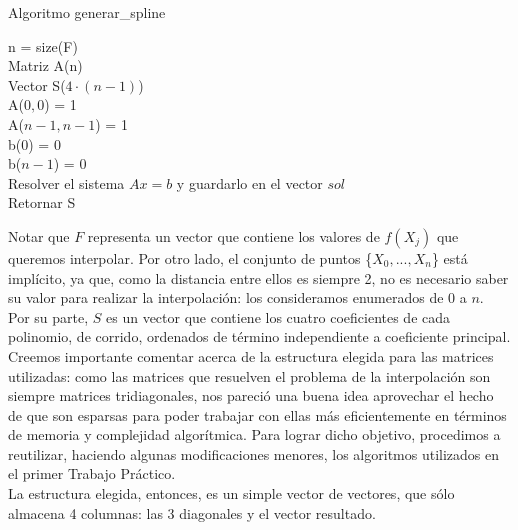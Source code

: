 \documentclass[a4paper]{article}
\begin{document}
\IncMargin{1em}
\begin{algorithm}[h!]
\NoCaptionOfAlgo
\caption{Algoritmo generar_spline}

\bigskip

n = size(F)\\
Matriz A(n)\\
Vector S($4\cdot(n-1)$)\\
\bigskip
A($0,0$) = 1\\
A($n-1,n-1$) = 1\\
b($0$) = $0$\\
b($n-1$) = $0$\\
\bigskip
{}
\bigskip
Resolver el sistema $Ax=b$ y guardarlo en el vector $sol$\\
\bigskip
{}
\bigskip
Retornar S
\end{algorithm}\DecMargin{1em}

\bigskip
Notar que $F$ representa un vector que contiene los valores de $f(X_j)$ que queremos interpolar. Por otro lado, el conjunto de puntos \{\(X_0, ..., X_n\)\} está implícito, ya que, como la distancia entre ellos es siempre 2, no es necesario saber su valor para realizar la interpolación: los consideramos enumerados de 0 a $n$. \\
\indent Por su parte, $S$ es un vector que contiene los cuatro coeficientes de cada polinomio, de corrido, ordenados de término independiente a coeficiente principal. \\

Creemos importante comentar acerca de la estructura elegida para las matrices utilizadas: como las matrices que resuelven el problema de la interpolación son siempre matrices tridiagonales, nos pareció una buena idea aprovechar el hecho de que son esparsas para poder trabajar con ellas más eficientemente en términos de memoria y complejidad algorítmica. Para lograr dicho objetivo, procedimos a reutilizar, haciendo algunas modificaciones menores, los algoritmos utilizados en el primer Trabajo Práctico.\\
\indent La estructura elegida, entonces, es un simple vector de vectores, que sólo almacena 4 columnas: las 3 diagonales y el vector resultado. \\
\end{document}
